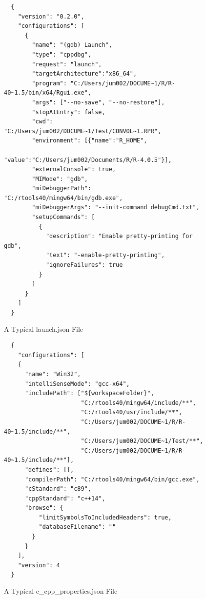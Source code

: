 \begin{Schunk}
  \begin{figure}[h]
  {\centering}
  \begin{verbatim}
  {
    "version": "0.2.0",
    "configurations": [
      {
        "name": "(gdb) Launch",
        "type": "cppdbg",
        "request": "launch",
        "targetArchitecture":"x86_64",
        "program": "C:/Users/jum002/DOCUME~1/R/R-40~1.5/bin/x64/Rgui.exe",
        "args": ["--no-save", "--no-restore"],
        "stopAtEntry": false,
        "cwd": "C:/Users/jum002/DOCUME~1/Test/CONVOL~1.RPR",
        "environment": [{"name":"R_HOME",
                         "value":"C:/Users/jum002/Documents/R/R-4.0.5"}],
        "externalConsole": true,
        "MIMode": "gdb",
        "miDebuggerPath": "C:/rtools40/mingw64/bin/gdb.exe",
        "miDebuggerArgs": "--init-command debugCmd.txt",
        "setupCommands": [
          {
            "description": "Enable pretty-printing for gdb",
            "text": "-enable-pretty-printing",
            "ignoreFailures": true
          }
        ]
      }
    ]
  }
  \end{verbatim}
  \caption[A Typical launch.json File]{A Typical launch.json File}
  \label{fig:launchJSON}
  \end{figure}
\end{Schunk}
    
\begin{Schunk}
  \begin{figure}[h]
  {\centering}
  \begin{verbatim}
  {
    "configurations": [
    {
      "name": "Win32",
      "intelliSenseMode": "gcc-x64",
      "includePath": ["${workspaceFolder}",
                      "C:/rtools40/mingw64/include/**",
                      "C:/rtools40/usr/include/**",
                      "C:/Users/jum002/DOCUME~1/R/R-40~1.5/include/**",
                      "C:/Users/jum002/DOCUME~1/Test/**",
                      "C:/Users/jum002/DOCUME~1/R/R-40~1.5/include/**"],
      "defines": [],
      "compilerPath": "C:/rtools40/mingw64/bin/gcc.exe",
      "cStandard": "c89",
      "cppStandard": "c++14",
      "browse": {
          "limitSymbolsToIncludedHeaders": true,
          "databaseFilename": ""
        }
      }
    ],
    "version": 4
  }
  \end{verbatim}
  \caption[A Typical c\_cpp\_properties.json File]{A Typical c\_cpp\_properties.json File}
  \label{fig:CnCppProp}
  \end{figure}
\end{Schunk}
    
